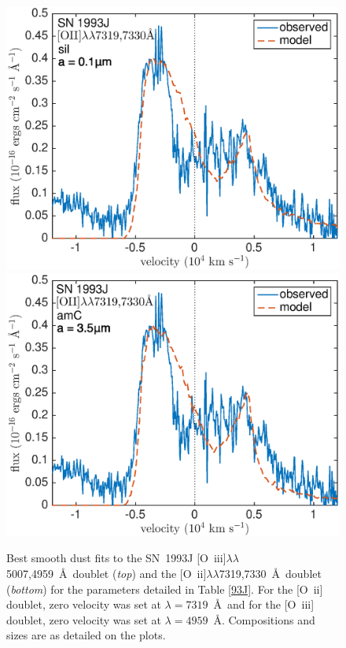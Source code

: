 {\begin{figure}[!t]
\includegraphics[scale=0.4,clip=true, trim=0 0 40 20]{chapters/chapter6/figs/93J/smooth/OII}
\includegraphics[scale=0.4,clip=true, trim=30 0 40 20]{chapters/chapter6/figs/93J/smooth/OII_amC}
\caption{Best smooth dust fits to the SN~1993J [O~{\sc iii}]$\lambda\lambda$5007,4959~\AA\ doublet ({\em top}) and the [O~{\sc ii}]$\lambda\lambda$7319,7330~\AA\ doublet ({\em bottom}) for the parameters detailed in Table \ref{93J}.  For the [O~{\sc ii}] doublet, zero velocity was set at $\lambda=7319$~\AA\ and for the [O~{\sc iii}] doublet, zero velocity was set at $\lambda=4959$~\AA.  Compositions and sizes are as detailed on the plots.}
\label{93J_smooth}
\end{figure}
}

